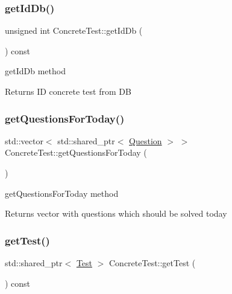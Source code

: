 \subsubsection{\texorpdfstring{get\+Id\+Db()}{getIdDb()}}
{\footnotesize\ttfamily unsigned int Concrete\+Test\+::get\+Id\+Db (\begin{DoxyParamCaption}{ }\end{DoxyParamCaption}) const}



get\+Id\+Db method 

\begin{DoxyReturn}{Returns}
ID concrete test from DB 
\end{DoxyReturn}
\mbox{\label{class_concrete_test_a718d41cba48881c2b9e4193bcff5ae02}} 
\subsubsection{\texorpdfstring{get\+Questions\+For\+Today()}{getQuestionsForToday()}}
{\footnotesize\ttfamily std\+::vector$<$ std\+::shared\+\_\+ptr$<$ \hyperlink{class_question}{Question} $>$ $>$ Concrete\+Test\+::get\+Questions\+For\+Today (\begin{DoxyParamCaption}{ }\end{DoxyParamCaption})}



get\+Questions\+For\+Today method 

\begin{DoxyReturn}{Returns}
vector with questions which should be solved today 
\end{DoxyReturn}
\mbox{\label{class_concrete_test_a1cd1879a0356b614266e5cd7bcbe4ff4}} 
\subsubsection{\texorpdfstring{get\+Test()}{getTest()}}
{\footnotesize\ttfamily std\+::shared\+\_\+ptr$<$ \hyperlink{class_test}{Test} $>$ Concrete\+Test\+::get\+Test (\begin{DoxyParamCaption}{ }\end{DoxyParamCaption}) const}



